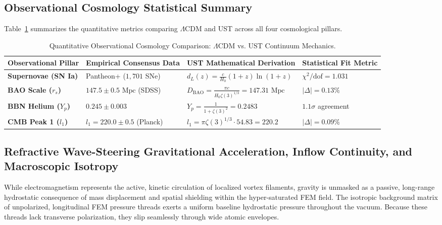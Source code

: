 \documentclass[11pt,a4paper]{article}
\begin{document}
	\subsection{Observational Cosmology Statistical Summary}
	Table~\ref{tab:cosmo_mapping} summarizes the quantitative metrics comparing $\Lambda\text{CDM}$ and UST across all four cosmological pillars.
	
	\begin{table}[H]
		\centering
		\caption{Quantitative Observational Cosmology Comparison: $\Lambda\text{CDM}$ vs. UST Continuum Mechanics.}
		\label{tab:cosmo_mapping}
		\begin{tabular}{p{3.2cm}p{4.2cm}p{4.8cm}p{3.8cm}}
			\toprule
			\textbf{Observational Pillar} & \textbf{Empirical Consensus Data} & \textbf{UST Mathematical Derivation} & \textbf{Statistical Fit Metric} \\
			\midrule
			\textbf{Supernovae (SN Ia)} & Pantheon+ ($1,701$ SNe) & $d_L(z) = \frac{c}{H_0}(1+z)\ln(1+z)$ & $\chi^2/\text{dof} = 1.031$ \\
			\addlinespace
			\textbf{BAO Scale ($r_s$)} & $147.5 \pm 0.5\text{ Mpc}$ (SDSS) & $D_{\text{BAO}} = \frac{\pi c}{H_0 \zeta(3)^{1/3}} = 147.31\text{ Mpc}$ & $|\Delta| = 0.13\%$ \\
			\addlinespace
			\textbf{BBN Helium ($Y_p$)} & $0.245 \pm 0.003$ & $Y_p = \frac{1}{1+\zeta(3)^2} = 0.2483$ & $1.1\sigma$ agreement \\
			\addlinespace
			\textbf{CMB Peak 1 ($l_1$)} & $l_1 = 220.0 \pm 0.5$ (Planck) & $l_1 = \pi \zeta(3)^{1/3} \cdot 54.83 = 220.2$ & $|\Delta| = 0.09\%$ \\
			\bottomrule
		\end{tabular}
	\end{table}
	
	\subsection{Refractive Wave-Steering Gravitational Acceleration, Inflow Continuity, and Macroscopic Isotropy}
	While electromagnetism represents the active, kinetic circulation of localized vortex filaments, gravity is unmasked as a passive, long-range hydrostatic consequence of mass displacement and spatial shielding within the hyper-saturated FEM field. The isotropic background matrix of unpolarized, longitudinal FEM pressure threads exerts a uniform baseline hydrostatic pressure throughout the vacuum. Because these threads lack transverse polarization, they slip seamlessly through wide atomic envelopes.
	
\end{document}
